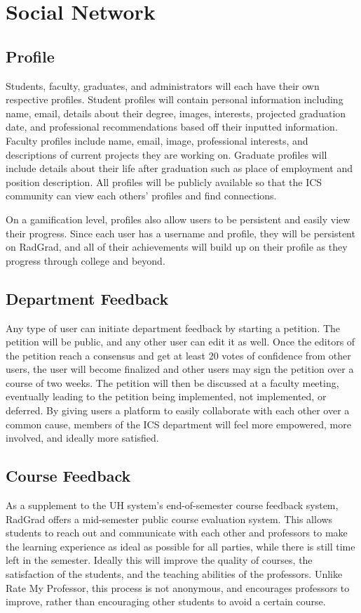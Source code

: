 \section{Social Network}
\subsection{Profile}
Students, faculty, graduates, and administrators will each have their own respective profiles. Student profiles will contain personal information including name, email, details about their degree, images, interests, projected graduation date, and professional recommendations based off their inputted information. Faculty profiles include name, email, image, professional interests, and descriptions of current projects they are working on. Graduate profiles will include details about their life after graduation such as place of employment and position description. All profiles will be publicly available so that the ICS community can view each others' profiles and find connections. 

On a gamification level, profiles also allow users to be persistent and easily view their progress. Since each user has a username and profile, they will be persistent on RadGrad, and all of their achievements will build up on their profile as they progress through college and beyond.
\subsection{Department Feedback}
Any type of user can initiate department feedback by starting a petition. The petition will be public, and any other user can edit it as well. Once the editors of the petition reach a consensus and get at least 20 votes of confidence from other users, the user will become finalized and other users may sign the petition over a course of two weeks. The petition will then be discussed at a faculty meeting, eventually leading to the petition being implemented, not implemented, or deferred. By giving users a platform to easily collaborate with each other over a common cause, members of the ICS department will feel more empowered, more involved, and ideally more satisfied.
\subsection{Course Feedback}
As a supplement to the UH system's end-of-semester course feedback system, RadGrad offers a mid-semester public course evaluation system. This allows students to reach out and communicate with each other and professors to make the learning experience as ideal as possible for all parties, while there is still time left in the semester. Ideally this will improve the quality of courses, the satisfaction of the students, and the teaching abilities of the professors. Unlike Rate My Professor, this process is not anonymous, and encourages professors to improve, rather than encouraging other students to avoid a certain course. 
